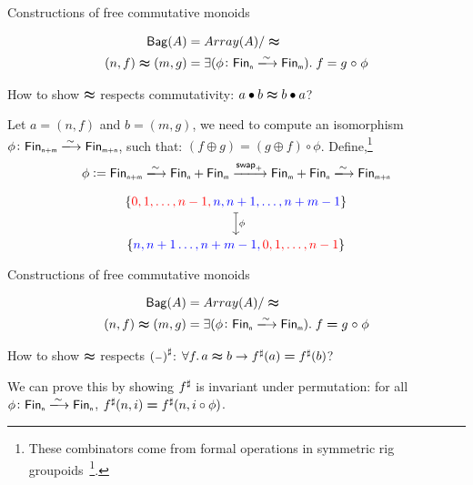 \documentclass[9pt]{beamer}
\begin{document}
\begin{frame}[fragile]{Constructions of free commutative monoids}
    \begin{dblock}[Bags]
        \vspace{-0.4cm}
        \begin{align*}
            \type{Bag}(A) &= Array(A) / \reln
            \\
            (n,f) \reln (m,g) &= 
                \exis{\phi\colon \Fin[n]\xto{\sim}\Fin[m]}{f = g \comp \phi}
        \end{align*}
    \end{dblock}
    How to show $\mathrel{\boldsymbol{\approx}}$ respects \alert{commutativity}: $a \bullet b \mathrel{\boldsymbol{\approx}} b \bullet a$?

    Let $a = (n , f)$ and $b = (m , g)$, we need to compute an isomorphism $\phi\colon \Fin[n+m]\xto{\sim}\Fin[m+n]$,
    such that: $(f \oplus g) = (g \oplus f) \circ \phi$.
    Define,\footnote{These combinators come from formal operations in symmetric rig groupoids~\footcite{choudhurySymmetriesReversibleProgramming2022}.}
    \begin{align*}
        \phi := \Fin[n+m] \xto{\sim} \Fin[n] + \Fin[m] \xto{\term{swap}_{+}} \Fin[m] + \Fin[n] \xto{\sim} \Fin[m+n] \\
    \end{align*}
    \vspace{-1cm}


\[
\begin{tikzcd}[ampersand replacement=\&,cramped]
	{\{\color{red}0,1,\dots,n-1, \color{blue} n,n+1,\dots,n+m-1 \color{black}\}} \\
	{ \{\color{blue}n,n+1\dots,n+m-1, \color{red}0,1,\dots,n-1 \color{black}\}}
    \arrow["\phi", maps to, from=1-1, to=2-1]
\end{tikzcd}\]
    
\end{frame}

\begin{frame}[fragile]{Constructions of free commutative monoids}
    \begin{dblock}[Bags]
        \vspace{-0.4cm}
        \begin{align*}
            \type{Bag}(A) &= Array(A) / \reln
            \\
            (n,f) \reln (m,g) &= 
                \exis{\phi\colon \Fin[n]\xto{\sim}\Fin[m]}{f \id g \comp \phi}
        \end{align*}
    \end{dblock}
    How to show $\mathrel{\boldsymbol{\approx}}$ respects ${({\scriptstyle{-}})}^{\sharp}$: $\forall f. \, a \reln b \to \ext{f}(a) \id \ext{f}(b)$?

    We can prove this by showing ${f}^{\sharp}$ is \alert{invariant under permutation}: for all $\phi\colon \Fin[n]\xto{\sim}\Fin[n]$,
    $\ext{f}(n, i) \id \ext{f}(n, i \circ \phi)$.
    
\end{frame}
\end{document}
